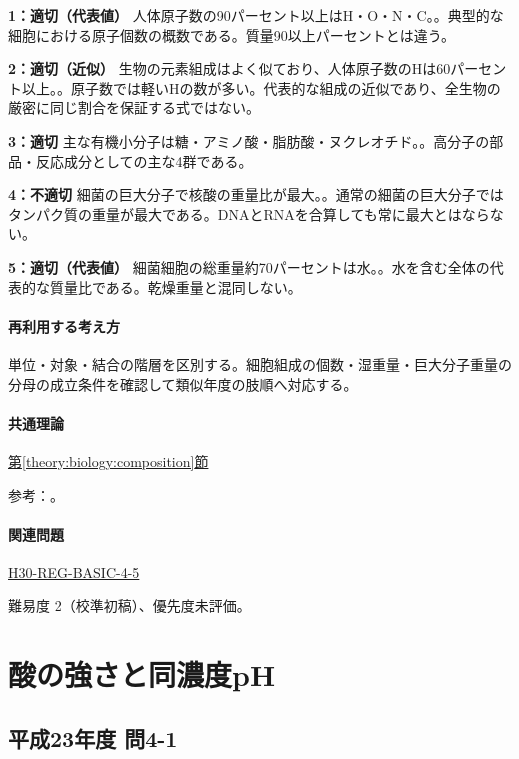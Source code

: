 \noindent\textbf{1：適切（代表値）} 人体原子数の90パーセント以上はH・O・N・C。。典型的な細胞における原子個数の概数である。質量90以上パーセントとは違う。\par

\noindent\textbf{2：適切（近似）} 生物の元素組成はよく似ており、人体原子数のHは60パーセント以上。。原子数では軽いHの数が多い。代表的な組成の近似であり、全生物の厳密に同じ割合を保証する式ではない。\par

\noindent\textbf{3：適切} 主な有機小分子は糖・アミノ酸・脂肪酸・ヌクレオチド。。高分子の部品・反応成分としての主な4群である。\par

\noindent\textbf{4：不適切} 細菌の巨大分子で核酸の重量比が最大。。通常の細菌の巨大分子ではタンパク質の重量が最大である。DNAとRNAを合算しても常に最大とはならない。\par

\noindent\textbf{5：適切（代表値）} 細菌細胞の総重量約70パーセントは水。。水を含む全体の代表的な質量比である。乾燥重量と混同しない。\par

\paragraph{再利用する考え方} 単位・対象・結合の階層を区別する。細胞組成の個数・湿重量・巨大分子重量の分母の成立条件を確認して類似年度の肢順へ対応する。

\paragraph{共通理論} \hyperref[theory:biology:composition]{第\ref*{theory:biology:composition}節}

\par 参考：\cite{bio_composition}。

\paragraph{関連問題} \hyperref[q:h30-reg-basic-4-5]{H30-REG-BASIC-4-5}

\par 難易度 2（校準初稿）、優先度未評価。

\section{酸の強さと同濃度pH}

\subsection{平成23年度 問4-1}
\label{q:h23-reg-basic-4-1}

